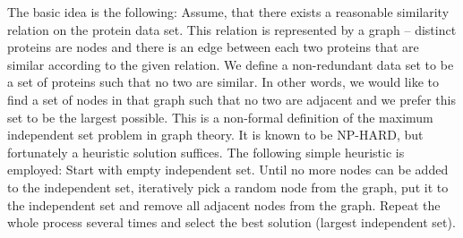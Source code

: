 \documentclass[11pt,twoside,a4paper]{book}
\begin{document}
The basic idea is the following: 
Assume, that there exists a reasonable similarity relation on the protein data set. 
This relation is represented by a graph -- distinct proteins are nodes and there
is an edge between each two proteins that are similar according to the given relation.
We define a non-redundant data set to be a set of proteins such that no two are similar.
In other words, we would like to find a set of nodes in that graph such that no two are adjacent
and we prefer this set to be the largest possible.
This is a non-formal definition of the maximum independent set problem in graph theory.
It is known to be NP-HARD, but fortunately a heuristic solution suffices.
The following simple heuristic is employed:
Start with empty independent set.
Until no more nodes can be added to the independent set,
iteratively pick a random node from the graph,
put it to the independent set and remove all adjacent nodes from the graph.
Repeat the whole process several times and select the best solution (largest independent set).
\end{document}
